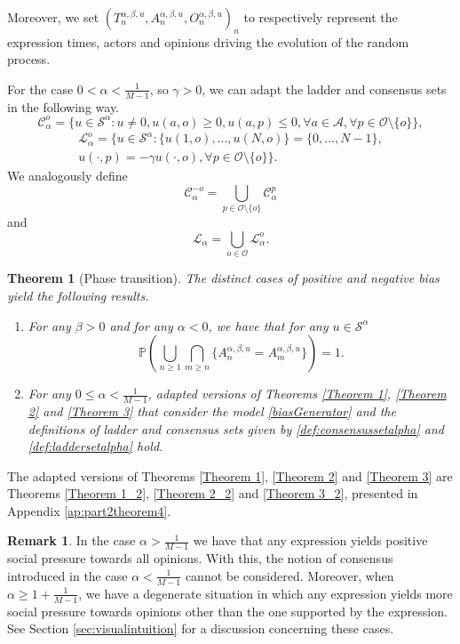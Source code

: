 \documentclass[11pt]{article}
\newtheorem{theorem}{Theorem}
\theoremstyle{definition}
\newtheorem{remark}{Remark}
\newcommand{\st}{\mathcal{S}}
\begin{document}
Moreover, we set $(T_n^{\alpha,\beta,u},A_n^{\alpha,\beta,u},O_n^{\alpha,\beta,u})_n$ to respectively represent the expression times, actors and opinions driving the evolution of the random process. 


For the case $0<\alpha< \frac{1}{M-1}$, so $\gamma>0$, we can adapt the ladder and consensus sets in the following way.
\begin{equation}\label{def:consensussetalpha}
\mathcal{C}_{\alpha}^{o} = \{u \in \mathcal{S}^{\alpha}:u\neq 0, u(a,o)\geq 0 ,u(a,p)\leq 0, \forall a\in\mathcal{A}, \forall p\in\mathcal{O}\setminus\{o\}\},
\end{equation}
\begin{multline}
\label{def:laddersetalpha}
\mathcal{L}_{\alpha}^{o}=\Big\{u\in\st^{\alpha}: \{u(1,o),...,u(N,o) \} = \{0,...,N-1 \}, \\ u(\cdot ,p)=-\gamma u(\cdot ,o), \forall p \in\mathcal{O}\setminus \{o\}\Big\}.
\end{multline}
We analogously define 
 \[
    \mathcal{C}^{-o}_{\alpha}=\bigcup_{p\in\mathcal{O}\setminus\{o\}}\mathcal{C}^p_\alpha
    \]
and
 \[\mathcal{L}_{\alpha}=\bigcup_{o\in\mathcal{O}}\mathcal{L}^o_{\alpha}.\]


\begin{theorem}[Phase transition]\label{Theorem 4} The distinct cases of positive and negative bias yield the following results.
    \begin{enumerate}
        \item For any $\beta>0$ and for any $\alpha<0$, we have that for any $u\in\mathcal{S}^{\alpha}$ 
        $$
            \mathbb{P}\left(\bigcup_{n\geq1}\bigcap_{m\geq n} \{A^{\alpha,\beta,u}_n=A^{\alpha,\beta,u}_m\} \right)=1.
        $$
        \item For any $0\leq \alpha <  \frac{1}{M-1}$, adapted versions of Theorems \ref{Theorem 1}, \ref{Theorem 2} and \ref{Theorem 3} that consider the model \eqref{biasGenerator} and the definitions of ladder and consensus sets given by \eqref{def:consensussetalpha} and \eqref{def:laddersetalpha} hold. 
    \end{enumerate}
\end{theorem}

The adapted versions of Theorems \ref{Theorem 1}, \ref{Theorem 2} and \ref{Theorem 3} are Theorems \ref{Theorem 1_2}, \ref{Theorem 2_2} and \ref{Theorem 3_2}, presented in Appendix \ref{ap:part2theorem4}.

\begin{remark}  In the case $\alpha>\frac{1}{M-1}$ we have that any expression yields positive social pressure towards all opinions. With this, the notion of consensus introduced in the case $\alpha<\frac{1}{M-1}$ cannot be considered. Moreover, when $\alpha\geq1+\frac{1}{M-1}$, we have a degenerate situation in which any expression yields more social pressure towards opinions other than the one supported by the expression. See Section \ref{sec:visualintuition} for a discussion concerning these cases.
\end{remark}
\end{document}
